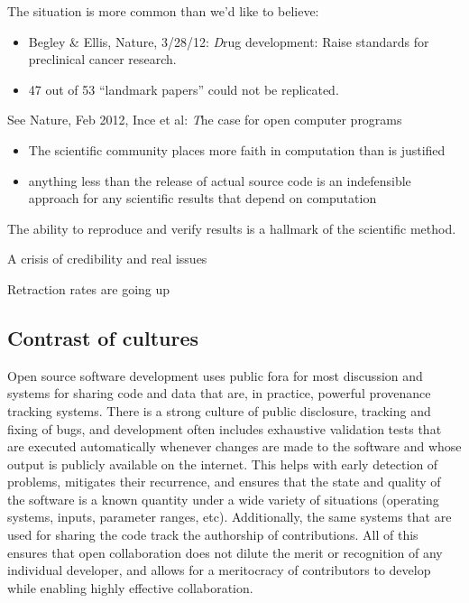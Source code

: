 \documentclass[ChapterTOCs,krantz2]{krantz} %
\begin{document}
The situation is more common than we'd like to believe:
\begin{itemize}
\item Begley \& Ellis, Nature, 3/28/12: {\emph Drug development:
Raise standards for preclinical cancer research.}
\item 47 out of 53 ``landmark papers'' could not be replicated.
\end{itemize}
See Nature, Feb 2012, Ince et al: {\emph The case for open computer programs}
\begin{itemize}
\item The scientific community places more faith in computation
than is justified
\item anything less than the release of actual source code is an
indefensible approach for any scientific results that depend on computation
\end{itemize}


The ability to reproduce and verify results is a hallmark of the
scientific method.

A crisis of credibility and real issues

Retraction rates are going up \cite{cokol2008retraction,steen2011retractions} 
\subsection{Contrast of cultures}

Open source software development uses public fora for most discussion
and systems for sharing code and data that are, in practice, powerful
provenance tracking systems. There is a strong culture of public disclosure,
tracking and fixing of bugs, and development often includes exhaustive
validation tests that are executed automatically whenever changes
are made to the software and whose output is publicly available on
the internet. This helps with early detection of problems, mitigates
their recurrence, and ensures that the state and quality of the software
is a known quantity under a wide variety of situations (operating
systems, inputs, parameter ranges, etc). Additionally, the same systems
that are used for sharing the code track the authorship of contributions.
All of this ensures that open collaboration does not dilute the merit
or recognition of any individual developer, and allows for a meritocracy
of contributors to develop while enabling highly effective collaboration.
\end{document}
